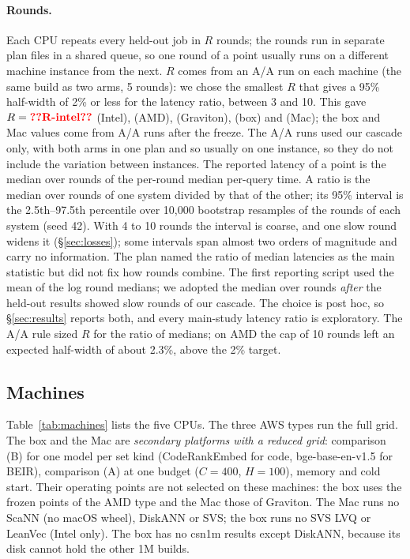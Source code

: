 \paragraph{Rounds.} Each CPU repeats every held-out job in $R$ rounds; the rounds run in separate plan
files in a shared queue, so one round of a point usually runs on a different machine instance from
the next. $R$ comes from an A/A run on each machine (the same build as two arms, 5 rounds): we chose the
smallest $R$ that gives a 95\% half-width of 2\% or less for the latency ratio, between 3 and 10.
This gave $R = \nm{R-intel}$ (Intel),  (AMD),  (Graviton),  (box) and
 (Mac); the box and Mac values come from A/A runs after the freeze. The A/A runs used our
cascade only, with both arms in one plan and so usually on one instance, so they do not include the variation between
instances. The reported latency of a point is the median over rounds of the per-round median
per-query time. A ratio is the median over rounds of one system divided by that of the other; its 95\%
interval is the 2.5th--97.5th percentile over 10,000 bootstrap resamples of the rounds of each system
(seed 42). With 4 to 10 rounds the interval is coarse, and one slow round widens it (\S\ref{sec:losses}); some
intervals span almost two orders of magnitude and carry no information. The plan named the ratio of median latencies
as the main statistic but did not fix how rounds combine. The first reporting script used the mean of the log round
medians; we adopted the median over rounds \emph{after} the held-out results showed slow rounds of our cascade. The
choice is post hoc, so \S\ref{sec:results} reports both, and every main-study latency ratio is exploratory.
The A/A rule sized $R$ for the ratio of medians; on AMD the cap of 10 rounds left an expected
half-width of about 2.3\%, above the 2\% target.

\subsection{Machines}

Table~\ref{tab:machines} lists the five CPUs. The three AWS types run the full grid. The box and the Mac
are \emph{secondary platforms with a reduced grid}: comparison (B) for one model per set kind
(CodeRankEmbed for code, bge-base-en-v1.5 for BEIR), comparison (A) at one budget ($C = 400$,
$H = 100$), memory and cold start. Their operating points are not selected on these machines: the box
uses the frozen points of the AMD type and the Mac those of Graviton. The Mac runs no ScaNN (no macOS
wheel), DiskANN or SVS; the box runs no SVS LVQ or LeanVec (Intel only). The box has no csn1m results
except DiskANN, because its disk cannot hold the other 1M builds.

